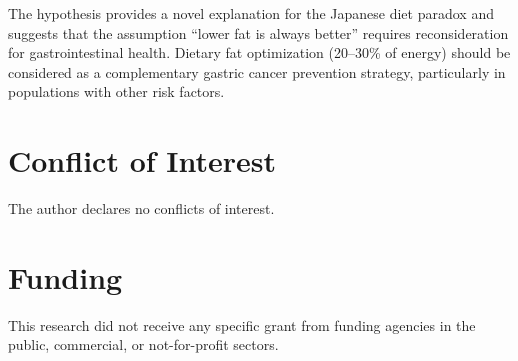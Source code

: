 \documentclass[review]{elsarticle}
\begin{document}
The hypothesis provides a novel explanation for the Japanese diet paradox and suggests that the assumption ``lower fat is always better'' requires reconsideration for gastrointestinal health. Dietary fat optimization (20--30\% of energy) should be considered as a complementary gastric cancer prevention strategy, particularly in populations with other risk factors.

\section*{Conflict of Interest}

The author declares no conflicts of interest.

\section*{Funding}

This research did not receive any specific grant from funding agencies in the public, commercial, or not-for-profit sectors.


\end{document}
